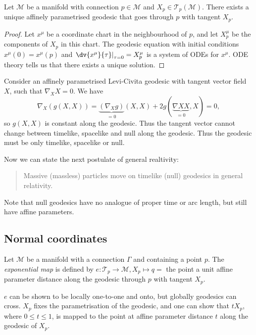 \documentclass{jknotes}
\begin{document}
\begin{theorem}
    Let \(\mathcal{M}\) be a manifold with connection \(p \in \mathcal{M}\) and \(X_p \in \mathcal{T}_p(\mathcal{M})\). There exists a unique affinely parametrised geodesic that goes through \(p\) with tangent \(X_p\).
\end{theorem}
\begin{proof}
    Let \(x^\mu\) be a coordinate chart in the neighbourhood of \(p\), and let \(X^\mu_p\) be the components of \(X_p\) in this chart. The geodesic equation with initial conditions \(x^\mu(0) = x^\mu(p)\) and \(\left.\dv{x^\mu}{\tau}\right|_{\tau=0}=X_p^\mu\) is a system of ODEs for \(x^\mu\). ODE theory tells us that there exists a unique solution.
\end{proof}

Consider an affinely parametrised Levi-Civita geodesic with tangent vector field \(X\), such that \(\nabla_X X = 0\). We have
\begin{equation}
    \nabla_X(g(X,X)) = \underbrace{(\nabla_X g)}_{=0}(X,X) + 2g(\underbrace{\nabla X X}_{=0},X) = 0,
\end{equation}
so \(g(X,X)\) is constant along the geodesic. Thus the tangent vector cannot change between timelike, spacelike and null along the geodesic. Thus the geodesic must be only timelike, spacelike or null.

Now we can state the next postulate of general realtivity:
\begin{quote}
    Massive (massless) particles move on timelike (null) geodesics in general relativity.
\end{quote}
Note that null geodesics have no analogue of proper time or arc length, but still have affine parameters.

\subsection{Normal coordinates}
\begin{defn}
Let \(\mathcal{M}\) be a manifold with a connection \(\Gamma\) and containing a point \(p\). The \emph{exponential map} is defined by \(e:\mathcal{T}_p\to\mathcal{M},X_p\mapsto q = \) the point a unit affine parameter distance along the geodesic through \(p\) with tangent \(X_p\). 
\end{defn}

\(e\) can be shown to be locally one-to-one and onto, but globally geodesics can cross. \(X_p\) fixes the parametrisation of the geodesic, and one can show that \(t X_p\), where \(0\le t \le 1\), is mapped to the point at affine parameter distance \(t\) along the geodesic of \(X_p\).
\end{document}
